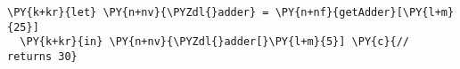 \begin{Verbatim}[commandchars=\\\{\}]
\PY{k+kr}{let} \PY{n+nv}{\PYZdl{}adder} = \PY{n+nf}{getAdder}[\PY{l+m}{25}]
  \PY{k+kr}{in} \PY{n+nv}{\PYZdl{}adder[}\PY{l+m}{5}] \PY{c}{// returns 30}
\end{Verbatim}
